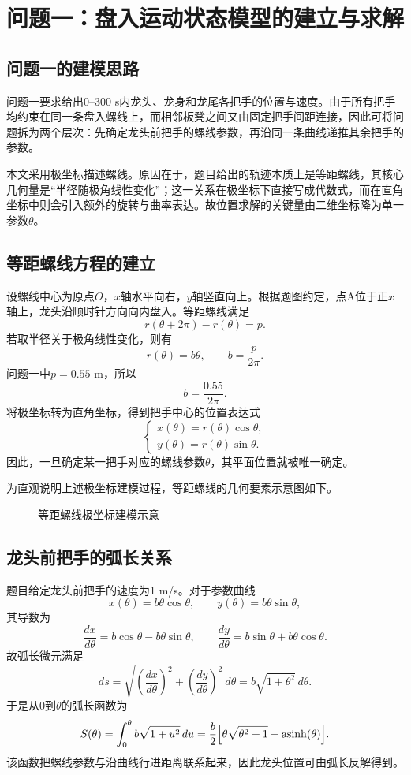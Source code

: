 \section{问题一：盘入运动状态模型的建立与求解}
\subsection{问题一的建模思路}
问题一要求给出0--300 s内龙头、龙身和龙尾各把手的位置与速度。由于所有把手均约束在同一条盘入螺线上，而相邻板凳之间又由固定把手间距连接，因此可将问题拆为两个层次：先确定龙头前把手的螺线参数，再沿同一条曲线递推其余把手的参数。

本文采用极坐标描述螺线。原因在于，题目给出的轨迹本质上是等距螺线，其核心几何量是“半径随极角线性变化”；这一关系在极坐标下直接写成代数式，而在直角坐标中则会引入额外的旋转与曲率表达。故位置求解的关键量由二维坐标降为单一参数$\theta$。

\subsection{等距螺线方程的建立}
设螺线中心为原点$O$，$x$轴水平向右，$y$轴竖直向上。根据题图约定，点A位于正$x$轴上，龙头沿顺时针方向向内盘入。等距螺线满足
\[
r(\theta+2\pi)-r(\theta)=p.
\]
若取半径关于极角线性变化，则有
\[
r(\theta)=b\theta,\qquad b=\frac{p}{2\pi}.
\]
问题一中$p=0.55$ m，所以
\[
b=\frac{0.55}{2\pi}.
\]
将极坐标转为直角坐标，得到把手中心的位置表达式
\[
\begin{cases}
x(\theta)=r(\theta)\cos\theta,\\
y(\theta)=r(\theta)\sin\theta.
\end{cases}
\]
因此，一旦确定某一把手对应的螺线参数$\theta$，其平面位置就被唯一确定。

为直观说明上述极坐标建模过程，等距螺线的几何要素示意图如下。

\begin{figure}[H]
\centering
{}
\caption{等距螺线极坐标建模示意}
\label{fig:q1-spiral-model}
\end{figure}

\subsection{龙头前把手的弧长关系}
题目给定龙头前把手的速度为1 m/s。对于参数曲线
\[
x(\theta)=b\theta\cos\theta,\qquad y(\theta)=b\theta\sin\theta,
\]
其导数为
\[
\frac{dx}{d\theta}=b\cos\theta-b\theta\sin\theta,\qquad
\frac{dy}{d\theta}=b\sin\theta+b\theta\cos\theta.
\]
故弧长微元满足
\[
ds=\sqrt{\left(\frac{dx}{d\theta}\right)^2+\left(\frac{dy}{d\theta}\right)^2}\,d\theta
=b\sqrt{1+\theta^2}\,d\theta.
\]
于是从0到$\theta$的弧长函数为
\[
S(\theta)=\int_0^\theta b\sqrt{1+u^2}\,du
=\frac{b}{2}\Bigl[\theta\sqrt{\theta^2+1}+\operatorname{asinh}(\theta)\Bigr].
\]
该函数把螺线参数与沿曲线行进距离联系起来，因此龙头位置可由弧长反解得到。


